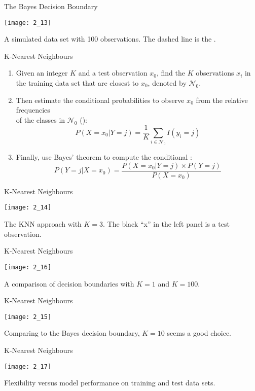 \documentclass[mathserif, aspectratio=169]{beamer}
\begin{document}
\begin{frame}{The Bayes Decision Boundary}
	\vspace{-2mm}
	\begin{center}
		\texttt{[image: 2\_13]}

		A simulated data set with 100 observations. The dashed line is the .
	\end{center}
\end{frame}

\begin{frame}{K-Nearest Neighbours}
	\begin{enumerate}
		\item Given an integer $K$ and a test observation $x_0$, find the $K$ observations $x_i$
			in the training data set that are closest to $x_0$, denoted by $\mathcal{N}_0$.
		\item Then estimate the conditional probabilities to observe $x_0$ from the relative frequencies\\
			of the classes in $\mathcal{N}_0$ ():
			\[ P(X=x_0\vert Y=j) = \frac{1}{K}\sum_{i \in\mathcal{N}_0} I(y_i = j) \]
		\item Finally, use Bayes' theorem to compute the conditional :
			\[P(Y=j\vert X=x_0) = \frac{P(X=x_0\vert Y=j)\times P(Y=j)}{P(X=x_0)}\]
	\end{enumerate}
\end{frame}

\begin{frame}{K-Nearest Neighbours}
	\begin{center}
		\texttt{[image: 2\_14]}

		The KNN approach with $K=3$. The black ``x'' in the left panel is a test observation.
	\end{center}
\end{frame}

\begin{frame}{K-Nearest Neighbours}
	\begin{center}
		\texttt{[image: 2\_16]}

		A comparison of decision boundaries with $K=1$ and $K=100$. 
	\end{center}
\end{frame}

\begin{frame}{K-Nearest Neighbours}
	\begin{center}
		\texttt{[image: 2\_15]}

		Comparing to the Bayes decision boundary, $K=10$ seems a good choice. 
	\end{center}
\end{frame}

\begin{frame}{K-Nearest Neighbours}
	\begin{center}
		\texttt{[image: 2\_17]}

		Flexibility versus model performance on training and test data sets. 
	\end{center}
\end{frame}
\end{document}
